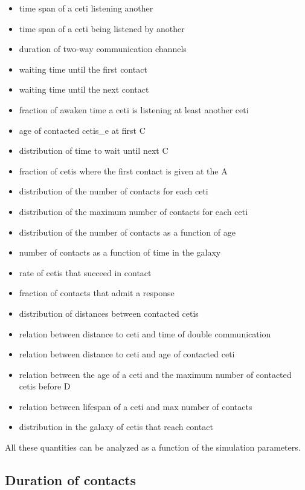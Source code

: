 \documentclass[useAMS,usenatbib]{mnras}
\begin{document}
\begin{itemize}
   \item time span of a ceti listening another
   \item time span of a ceti being listened by another
   \item duration of two-way communication channels
   \item waiting time until the first contact
   \item waiting time until the next contact
   \item fraction of awaken time a ceti is listening at least another ceti 
   \item age of contacted cetis\_e at first C
   \item distribution of time to wait until next C
   \item fraction of cetis where the first contact is given at the A       
   \item distribution of the number of contacts for each ceti         
   \item distribution of the maximum number of contacts for each ceti 
   \item distribution of the number of contacts as a function of age  
   \item number of contacts as a function of time in the galaxy       
   \item rate of cetis that succeed in contact                        
   \item fraction of contacts that admit a response                   
   \item distribution of distances between contacted cetis 
   \item relation between distance to ceti and time of double communication 
   \item relation between distance to ceti and age of contacted ceti
   \item relation between the age of a ceti and the maximum number of contacted cetis before D
   \item relation between lifespan of a ceti and max number of contacts
   \item distribution in the galaxy of cetis that reach contact
\end{itemize}


All these quantities can be analyzed as a function of the simulation
parameters.



\subsection{Duration of contacts}
\end{document}
